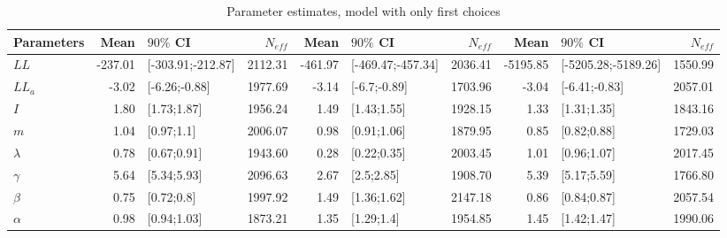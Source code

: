 \begin{table}

\caption{\label{tab:}Parameter estimates, model with only first choices}
\centering
\begin{tabular}[t]{lrlrrlrrlr}
\toprule
Parameters & Mean & $90\%$ CI & $N_{eff}$ & Mean & $90\%$ CI & $N_{eff}$ & Mean & $90\%$ CI & $N_{eff}$\\
\midrule
$LL$ & -237.01 & [-303.91;-212.87] & 2112.31 & -461.97 & [-469.47;-457.34] & 2036.41 & -5195.85 & [-5205.28;-5189.26] & 1550.99\\
$LL_a$ & -3.02 & [-6.26;-0.88] & 1977.69 & -3.14 & [-6.7;-0.89] & 1703.96 & -3.04 & [-6.41;-0.83] & 2057.01\\
$I$ & 1.80 & [1.73;1.87] & 1956.24 & 1.49 & [1.43;1.55] & 1928.15 & 1.33 & [1.31;1.35] & 1843.16\\
$m$ & 1.04 & [0.97;1.1] & 2006.07 & 0.98 & [0.91;1.06] & 1879.95 & 0.85 & [0.82;0.88] & 1729.03\\
$\lambda$ & 0.78 & [0.67;0.91] & 1943.60 & 0.28 & [0.22;0.35] & 2003.45 & 1.01 & [0.96;1.07] & 2017.45\\
\addlinespace
$\gamma$ & 5.64 & [5.34;5.93] & 2096.63 & 2.67 & [2.5;2.85] & 1908.70 & 5.39 & [5.17;5.59] & 1766.80\\
$\beta$ & 0.75 & [0.72;0.8] & 1997.92 & 1.49 & [1.36;1.62] & 2147.18 & 0.86 & [0.84;0.87] & 2057.54\\
$\alpha$ & 0.98 & [0.94;1.03] & 1873.21 & 1.35 & [1.29;1.4] & 1954.85 & 1.45 & [1.42;1.47] & 1990.06\\
\bottomrule
\end{tabular}
\end{table}
